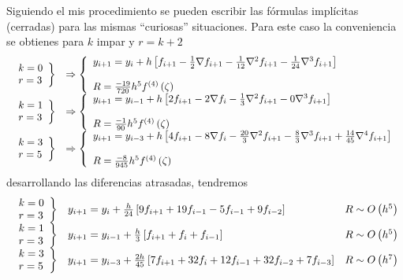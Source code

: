 \documentclass[spanish,titlepage,11pt]{article}
\begin{document}
Siguiendo el mis procedimiento se pueden escribir las f\'{o}rmulas
impl\'{i}citas (cerradas) para las mismas ``curiosas'' situaciones. Para este
caso la conveniencia se obtienes para $k$ impar y $r=k+2$
\[%
\begin{array}
[c]{ll}%
\left.
\begin{array}
[c]{l}%
k=0\\
r=3
\end{array}
\right\}  & \Rightarrow\left\{
\begin{array}
[c]{l}%
y_{i+1}=y_{i}+h\left[  f_{i+1}-\frac{1}{2}\nabla f_{i+1}-\frac{1}{12}%
\nabla^{2}f_{i+1}-\frac{1}{24}\nabla^{3}f_{i+1}\right] \\
\\
R=\frac{-19}{720}h^{5}f^{(4)}\left(  \zeta\right)
\end{array}
\right. \\
\left.
\begin{array}
[c]{l}%
k=1\\
r=3
\end{array}
\right\}  & \Rightarrow\left\{
\begin{array}
[c]{l}%
y_{i+1}=y_{i-1}+h\left[  2f_{i+1}-2\nabla f_{i}-\frac{1}{3}\nabla^{2}%
f_{i+1}-0\nabla^{3}f_{i+1}\right] \\
\\
R=\frac{-1}{90}h^{5}f^{(4)}\left(  \zeta\right)
\end{array}
\right. \\
\left.
\begin{array}
[c]{l}%
k=3\\
r=5
\end{array}
\right\}  & \Rightarrow\left\{
\begin{array}
[c]{l}%
y_{i+1}=y_{i-3}+h\left[  4f_{i+1}-8\nabla f_{i}-\frac{20}{3}\nabla^{2}%
f_{i+1}-\frac{8}{3}\nabla^{3}f_{i+1}+\frac{14}{45}\nabla^{4}f_{i+1}\right] \\
\\
R=\frac{-8}{945}h^{5}f^{(4)}\left(  \zeta\right)
\end{array}
\right.
\end{array}
\]
desarrollando las diferencias atrasadas, tendremos
\[%
\begin{array}
[c]{lll}%
\left.
\begin{array}
[c]{l}%
k=0\\
r=3
\end{array}
\right\}  & y_{i+1}=y_{i}+\frac{h}{24}\left[  9f_{i+1}+19f_{i-1}%
-5f_{i-1}+9f_{i-2}\right]  & R\sim O\left(  h^{5}\right) \\
\left.
\begin{array}
[c]{l}%
k=1\\
r=3
\end{array}
\right\}  & y_{i+1}=y_{i-1}+\frac{h}{3}\left[  f_{i+1}+f_{i}+f_{i-1}\right]  &
R\sim O\left(  h^{5}\right) \\
\left.
\begin{array}
[c]{l}%
k=3\\
r=5
\end{array}
\right\}  & y_{i+1}=y_{i-3}+\frac{2h}{45}\left[  7f_{i+1}+32f_{i}%
+12f_{i-1}+32f_{i-2}+7f_{i-3}\right]  & R\sim O\left(  h^{7}\right)
\end{array}
\]
\end{document}
